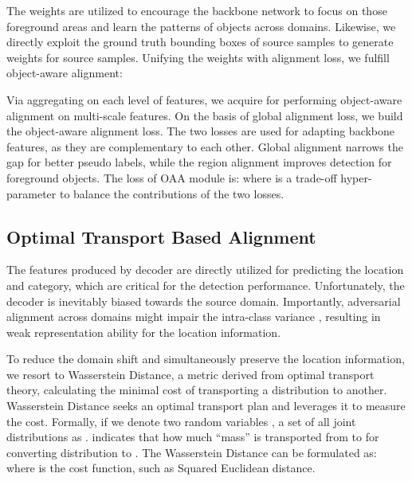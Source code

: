 \documentclass[sigconf]{acmart}
\begin{document}
The weights are utilized to encourage the backbone network to focus on those foreground areas and learn the patterns of objects across domains.
Likewise, we directly exploit the ground truth bounding boxes of source samples to generate weights for source samples.
Unifying the weights with alignment loss, we fulfill object-aware alignment: 



Via aggregating  on each level of features, we acquire  for performing object-aware alignment on multi-scale features. On the basis of global alignment loss, we build the object-aware alignment loss. The two losses are used for adapting backbone features, as they are complementary to each other. Global alignment narrows the gap for better pseudo labels, while the region alignment improves detection for foreground objects. The loss of OAA module is:
where  is a trade-off hyper-parameter to balance the contributions of the two losses.

\subsection{Optimal Transport Based Alignment}
The features produced by decoder are directly utilized for predicting the location and category, which are critical for the detection performance. Unfortunately, the decoder is inevitably biased towards the source domain. Importantly, adversarial alignment across domains might impair the intra-class variance \cite{bsp}, resulting in weak representation ability for the location information.

To reduce the domain shift and simultaneously preserve the location information, we resort to Wasserstein Distance, a metric derived from optimal transport theory, calculating the minimal cost of transporting a distribution to another. Wasserstein Distance seeks an optimal transport plan and leverages it to measure the cost. Formally, if we denote two random variables , a set of all joint distributions  as .  indicates that how much ``mass'' is transported from  to  for converting distribution  to . The Wasserstein Distance can be formulated as:
where  is the cost function, such as Squared Euclidean distance. 
\end{document}
